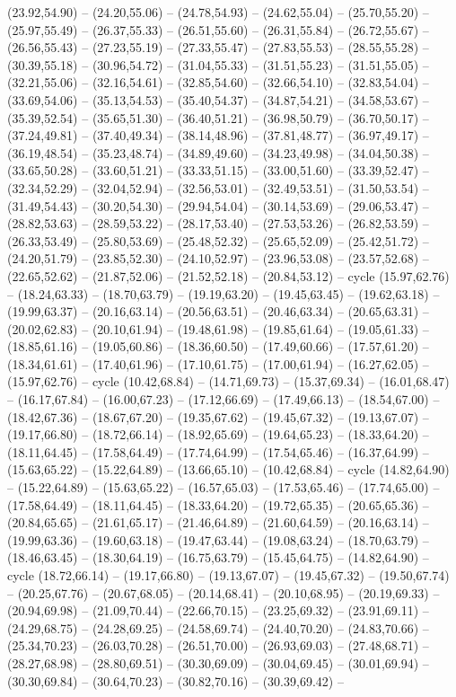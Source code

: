 {(23.92,54.90) -- (24.20,55.06) -- (24.78,54.93) -- (24.62,55.04) -- (25.70,55.20) -- (25.97,55.49) -- (26.37,55.33) -- (26.51,55.60) -- (26.31,55.84) -- (26.72,55.67) -- (26.56,55.43) -- (27.23,55.19) -- (27.33,55.47) -- (27.83,55.53) -- (28.55,55.28) -- (30.39,55.18) -- (30.96,54.72) -- (31.04,55.33) -- (31.51,55.23) -- (31.51,55.05) -- (32.21,55.06) -- (32.16,54.61) -- (32.85,54.60) -- (32.66,54.10) -- (32.83,54.04) -- (33.69,54.06) -- (35.13,54.53) -- (35.40,54.37) -- (34.87,54.21) -- (34.58,53.67) -- (35.39,52.54) -- (35.65,51.30) -- (36.40,51.21) -- (36.98,50.79) -- (36.70,50.17) -- (37.24,49.81) -- (37.40,49.34) -- (38.14,48.96) -- (37.81,48.77) -- (36.97,49.17) -- (36.19,48.54) -- (35.23,48.74) -- (34.89,49.60) -- (34.23,49.98) -- (34.04,50.38) -- (33.65,50.28) -- (33.60,51.21) -- (33.33,51.15) -- (33.00,51.60) -- (33.39,52.47) -- (32.34,52.29) -- (32.04,52.94) -- (32.56,53.01) -- (32.49,53.51) -- (31.50,53.54) -- (31.49,54.43) -- (30.20,54.30) -- (29.94,54.04) -- (30.14,53.69) -- (29.06,53.47) -- (28.82,53.63) -- (28.59,53.22) -- (28.17,53.40) -- (27.53,53.26) -- (26.82,53.59) -- (26.33,53.49) -- (25.80,53.69) -- (25.48,52.32) -- (25.65,52.09) -- (25.42,51.72) -- (24.20,51.79) -- (23.85,52.30) -- (24.10,52.97) -- (23.96,53.08) -- (23.57,52.68) -- (22.65,52.62) -- (21.87,52.06) -- (21.52,52.18) -- (20.84,53.12) -- cycle (15.97,62.76) -- (18.24,63.33) -- (18.70,63.79) -- (19.19,63.20) -- (19.45,63.45) -- (19.62,63.18) -- (19.99,63.37) -- (20.16,63.14) -- (20.56,63.51) -- (20.46,63.34) -- (20.65,63.31) -- (20.02,62.83) -- (20.10,61.94) -- (19.48,61.98) -- (19.85,61.64) -- (19.05,61.33) -- (18.85,61.16) -- (19.05,60.86) -- (18.36,60.50) -- (17.49,60.66) -- (17.57,61.20) -- (18.34,61.61) -- (17.40,61.96) -- (17.10,61.75) -- (17.00,61.94) -- (16.27,62.05) -- (15.97,62.76) -- cycle (10.42,68.84) -- (14.71,69.73) -- (15.37,69.34) -- (16.01,68.47) -- (16.17,67.84) -- (16.00,67.23) -- (17.12,66.69) -- (17.49,66.13) -- (18.54,67.00) -- (18.42,67.36) -- (18.67,67.20) -- (19.35,67.62) -- (19.45,67.32) -- (19.13,67.07) -- (19.17,66.80) -- (18.72,66.14) -- (18.92,65.69) -- (19.64,65.23) -- (18.33,64.20) -- (18.11,64.45) -- (17.58,64.49) -- (17.74,64.99) -- (17.54,65.46) -- (16.37,64.99) -- (15.63,65.22) -- (15.22,64.89) -- (13.66,65.10) -- (10.42,68.84) -- cycle (14.82,64.90) -- (15.22,64.89) -- (15.63,65.22) -- (16.57,65.03) -- (17.53,65.46) -- (17.74,65.00) -- (17.58,64.49) -- (18.11,64.45) -- (18.33,64.20) -- (19.72,65.35) -- (20.65,65.36) -- (20.84,65.65) -- (21.61,65.17) -- (21.46,64.89) -- (21.60,64.59) -- (20.16,63.14) -- (19.99,63.36) -- (19.60,63.18) -- (19.47,63.44) -- (19.08,63.24) -- (18.70,63.79) -- (18.46,63.45) -- (18.30,64.19) -- (16.75,63.79) -- (15.45,64.75) -- (14.82,64.90) -- cycle (18.72,66.14) -- (19.17,66.80) -- (19.13,67.07) -- (19.45,67.32) -- (19.50,67.74) -- (20.25,67.76) -- (20.67,68.05) -- (20.14,68.41) -- (20.10,68.95) -- (20.19,69.33) -- (20.94,69.98) -- (21.09,70.44) -- (22.66,70.15) -- (23.25,69.32) -- (23.91,69.11) -- (24.29,68.75) -- (24.28,69.25) -- (24.58,69.74) -- (24.40,70.20) -- (24.83,70.66) -- (25.34,70.23) -- (26.03,70.28) -- (26.51,70.00) -- (26.93,69.03) -- (27.48,68.71) -- (28.27,68.98) -- (28.80,69.51) -- (30.30,69.09) -- (30.04,69.45) -- (30.01,69.94) -- (30.30,69.84) -- (30.64,70.23) -- (30.82,70.16) -- (30.39,69.42) -- }
